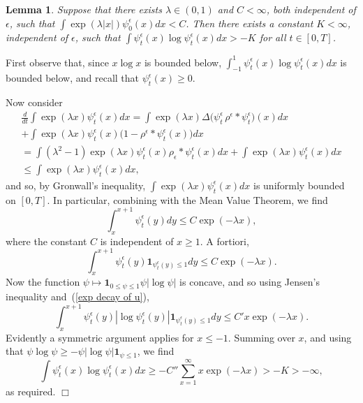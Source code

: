 \documentclass[12pt]{article}
\newenvironment {proof}{{\noindent\bf Proof }}{\hfill $\Box$ \medskip}
\newtheorem{lemma}[theorem]{Lemma}
\newcommand{\ind}{\mathbf{1}}
\newcommand{\kernel}{\rho}  %
\newcommand{\smooth}[1]{\kernel_{#1} \! * \!}  %
\numberwithin{equation}{section}
\begin{document}
\begin{lemma}
\label{lower bound on ulogu}
	Suppose that there exists $\lambda\in (0,1)$ and $C<\infty$, both independent of
$\epsilon$, such that $\int \exp(\lambda |x|) \psi_0^\epsilon(x) dx<C$.
Then there exists
a constant $K<\infty$, independent of $\epsilon$, such that  
 $\int \psi_t^\epsilon(x)\log \psi_t^\epsilon (x)dx>-K$ for all $t\in [0,T]$. 
\end{lemma}
\begin{proof}
First observe that, since $x\log x$ is bounded below, 
$\int_{-1}^1\psi_t^\epsilon(x)\log\psi_t^\epsilon(x) dx$ is bounded below,
and recall that $\psi_t^\epsilon(x) \ge 0$.

Now consider 
\begin{multline}
\frac{d}{dt}\int \exp(\lambda x) \psi_t^\epsilon (x)dx
	= \int \exp(\lambda x)\Delta \big(\psi_t^\epsilon \, \rho^{\epsilon}*\psi_t^\epsilon\big)(x) dx
	\\
	+ \int \exp(\lambda x)\psi_t^\epsilon(x)\big(1-\rho^{\epsilon}*\psi_t^\epsilon(x)\big) dx
    \\
	= \int (\lambda^2-1)\exp(\lambda x) \psi_t^\epsilon(x) \smooth{\epsilon} \psi_t^\epsilon(x) dx 
	+ \int \exp(\lambda x)\psi_t^\epsilon(x) dx
    \\
    \leq \int \exp(\lambda x)\psi_t^\epsilon(x) dx,
\end{multline}
and so, by Gronwall's inequality, 
$\int \exp(\lambda x)\psi_t^\epsilon (x)dx$ is uniformly bounded on $[0,T]$.
In particular, combining with the Mean Value Theorem, we find 
\begin{equation*}
\int_x^{x+1}\psi_t^\epsilon(y)dy\leq C\exp(-\lambda x),
\end{equation*}
where the constant $C$ is independent of $x\geq1$.
A fortiori, 
\begin{equation}
\label{exp decay of u} 
\int_x^{x+1}\psi_t^\epsilon(y)\ind_{\psi_t^\epsilon(y)\leq 1}dy\leq C\exp(-\lambda x).
\end{equation}
Now the function $\psi\mapsto \ind_{0\leq \psi\leq 1}\psi|\log \psi|$ is concave, and so 
using Jensen's inequality and~(\ref{exp decay of u}),
\begin{equation*}
\int_x^{x+1}\psi_t^\epsilon(y)
|\log \psi_t^\epsilon (y)|\ind_{\psi_t^\epsilon(y)\leq 1}dy
\leq C'x \exp(-\lambda x).
\end{equation*}
Evidently a symmetric argument applies for $x\leq -1$.
Summing over $x$,
    and using that $\psi \log \psi \ge - \psi |\log \psi| \ind_{\psi \le 1}$,
we find
\begin{equation*}
\int \psi_t^\epsilon (x) \log \psi_t^\epsilon (x) dx
\geq -C''\sum_{x=1}^\infty x\exp(-\lambda x)>-K>-\infty,  
\end{equation*}
as required.
\end{proof}
\end{document}
